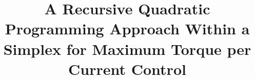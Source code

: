 \title{A Recursive Quadratic Programming Approach Within a Simplex for
Maximum Torque per Current Control}
\author{}
\date{}

\newcommand{\PaperAbstract}{%
This paper presents a recursive algorithm to solve quadratic minimization
problems constrained to the convex hull of vertices defining a simplex. The
method targets the minimization of copper losses in electric machines by
optimizing stator currents under the Maximum Torque Per Ampere (MTPA)
criterion. The quadratic form minimizes power loss given by
\(x^\top Qx\), where \(Q\) is the diagonal matrix of stator resistances and
\(x\) is the current vector constrained within the feasible region defined by
the convex hull. We discuss the theoretical background and provide the
implementation details of the recursive solver, highlighting its advantages
in guaranteeing feasibility and optimality within the simplex domain.}

\newcommand{\PaperKeywords}{Maximum Torque Per Ampere, quadratic programming,
convex optimization, recursive algorithms, electric machine control.}
